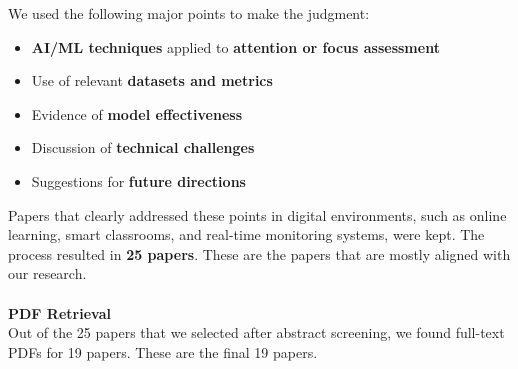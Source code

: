 \documentclass[12pt]{article}
\begin{document}
We used the following major points to make the judgment:
\begin{itemize}
    \item \textbf{AI/ML techniques} applied to \textbf{attention or focus assessment}
    \item Use of relevant \textbf{datasets and metrics}
    \item Evidence of \textbf{model effectiveness}
    \item Discussion of \textbf{technical challenges}
    \item Suggestions for \textbf{future directions}
\end{itemize}

Papers that clearly addressed these points in digital environments, such as online learning, smart classrooms, and real-time monitoring systems, were kept. The process resulted in \textbf{25 papers}. These are the papers that are mostly aligned with our research. \\ \\
\textbf{PDF Retrieval} \\ 
Out of the 25 papers that we selected after abstract screening, we found full-text PDFs for 19 papers. These are the final 19 papers.\\ \\
\end{document}
